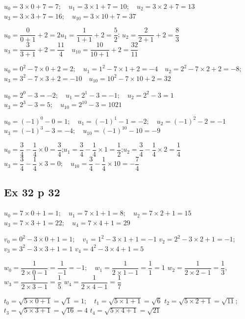 \documentclass[a4paper,french]{book}
\begin{document}
\begin{enumMet}
    \item $u_{0}=3 \times 0+7=7 ;\quad u_{1}=3 \times 1+7=10 ;\quad u_{2}=3 \times 2+7=13$\\
    $u_{3}=3 \times 3+7=16 ;\quad  u_{10}=3 \times 10+7=37$
    \item $u_{0}=\dfrac{0}{0+1}+2=2$\quad $u_{1}=\dfrac{1}{1+1}+2=\dfrac{5}{2}$; \quad $u_{2}=\dfrac{2}{2+1}+2=\dfrac{8}{3}$\\
    $u_{3}=\dfrac{3}{3+1}+2=\dfrac{11}{4} \quad u_{10}=\dfrac{10}{10+1}+2=\dfrac{32}{11}$
    \item $u_{0}=0^{2}-7 \times 0+2=2 ;\quad u_{1}=1^{2}-7 \times 1+2=-4 \quad u_{2}=2^{2}-7 \times 2+2=-8 ;$ \\
    $u_{3}=3^{2}-7 \times 3+2=-10 \quad u_{10}=10^{2}-7 \times 10+2=32 $
    \item $u_{0}=2^{0}-3=-2 ;\quad u_{1}=2^{1}-3=-1 ;\quad u_{2}=2^{2}-3=1$\\
    $u_{3}=2^{3}-3=5 ;\quad  u_{10}=2^{10}-3=1021$
    \item $u_{0}=(-1)^{0}-0=1 ;\quad u_{1}=(-1)^{1}-1=-2 ;\quad u_{2}=(-1)^{2}-2=-1$\\
    $u_{3}=(-1)^{3}-3=-4 ;\quad u_{10}=(-1)^{10}-10=-9$
    \item $u_{0}=\dfrac{3}{4}-\dfrac{1}{4} \times 0=\dfrac{3}{4}$;\quad  $u_{1}=\dfrac{3}{4}-\dfrac{1}{4} \times 1=\dfrac{1}{2}$;\quad $u_{2}=\dfrac{3}{4}-\dfrac{1}{4} \times 2=\dfrac{1}{4}$\\
    $u_{3}=\dfrac{3}{4}-\dfrac{1}{4} \times 3=0;\quad u_{10}=\dfrac{3}{4}-\dfrac{1}{4} \times 10=-\dfrac{7}{4}$
\end{enumMet}

\subsection*{Ex 32 p 32}

\begin{enumMet}
    \item $u_{0}=7 \times 0+1=1 ;\quad u_{1}=7 \times 1+1=8 ;\quad u_{2}=7 \times 2+1=15$\\
    $u_{3}=7 \times 3+1=22 ;\quad u_{4}=7 \times 4+1=29$
    \item $v_{0}=0^{2}-3 \times 0+1=1 ;\quad v_{1}=1^{2}-3 \times 1+1=-1$\quad
    $v_{2}=2^{2}-3 \times 2+1=-1 ;$\\
    $v_{3}=3^{2}-3 \times 3+1=1$\quad 
    $v_{4}=4^{2}-3 \times 4+1=5$
    \item $w_{0}=\dfrac{1}{2 \times 0-1}=\dfrac{1}{-1}=-1 ;\quad w_{1}=\dfrac{1}{2 \times 1-1}=\dfrac{1}{1}=1$\quad
    $w_{2}=\dfrac{1}{2 \times 2-1}=\dfrac{1}{3},$\\
    $w_{3}=\dfrac{1}{2 \times 3-1}=\dfrac{1}{5}$\quad
    $w_{4}=\dfrac{1}{2 \times 4-1}=\dfrac{1}{7}$
    \item $t_{0}=\sqrt{5 \times 0+1}=\sqrt{1}=1 ;\quad t_{1}=\sqrt{5 \times 1+1}=\sqrt{6}$\quad
    $t_{2}=\sqrt{5 \times 2+1}=\sqrt{11} ;$\\
    $ t_{3}=\sqrt{5 \times 3+1}=\sqrt{16}=4$\quad
    $t_{4}=\sqrt{5 \times 4+1}=\sqrt{21}$
\end{enumMet}
\end{document}
